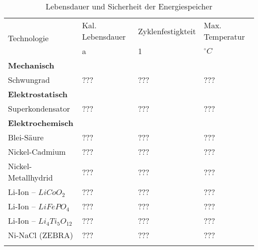\begin{table}\centering
	\begin{tabularx}{\linewidth}{XXXX}
		\toprule
		\multirow{2}{*}{Technologie} & Kal. Lebensdauer & Zyklenfestigkteit & Max. Temperatur \\
		                             & a                        & 1                 & $^\circ C$      \\ \midrule
		\textbf{Mechanisch}          &                          &                   &  \\
		Schwungrad                   & ???                      & ???               & ???             \\
		\textbf{Elektrostatisch}     &                          &                   &  \\
		Superkondensator             & ???                      & ???               & ???             \\
		\textbf{Elektrochemisch}     &                          &                   &  \\
		Blei-Säure                   & ???                      & ???               & ???             \\
		Nickel-Cadmium               & ???                      & ???               & ???             \\
		Nickel-Metallhydrid          & ???                      & ???               & ???             \\
		Li-Ion -- $LiCoO_2$          & ???                      & ???               & ???             \\
		Li-Ion -- $LiFePO_4$         & ???                      & ???               & ???             \\
		Li-Ion -- $Li_4Ti_5O_{12}$   & ???                      & ???               & ???             \\
		Ni-NaCl (ZEBRA)              & ???                      & ???               & ???             \\ \bottomrule
		                             &
	\end{tabularx}
	\caption{Lebensdauer und Sicherheit der Energiespeicher}
\end{table}
